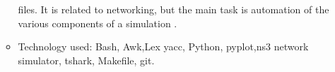 \begin{itemize}
\begin{itemize}
files. It is related to networking, but the main task is automation of the various components of a simulation .
	 \item Technology used: Bash, Awk,Lex yacc, Python, pyplot,ns3 network simulator, tshark, Makefile, git.
	\end{itemize}

		
\end{itemize}
